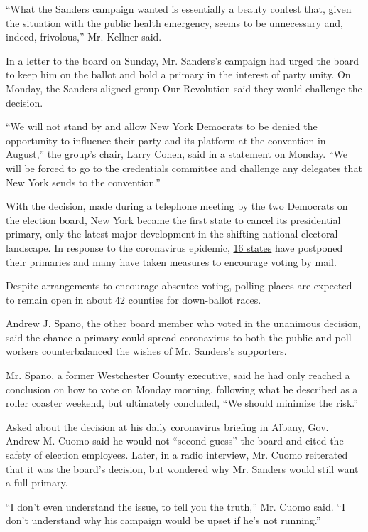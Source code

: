 ``What the Sanders campaign wanted is essentially a beauty contest that,
given the situation with the public health emergency, seems to be
unnecessary and, indeed, frivolous,'' Mr. Kellner said.

In a letter to the board on Sunday, Mr. Sanders's campaign had urged the
board to keep him on the ballot and hold a primary in the interest of
party unity. On Monday, the Sanders-aligned group Our Revolution said
they would challenge the decision.

``We will not stand by and allow New York Democrats to be denied the
opportunity to influence their party and its platform at the convention
in August,'' the group's chair, Larry Cohen, said in a statement on
Monday. ``We will be forced to go to the credentials committee and
challenge any delegates that New York sends to the convention.''

With the decision, made during a telephone meeting by the two Democrats
on the election board, New York became the first state to cancel its
presidential primary, only the latest major development in the shifting
national electoral landscape. In response to the coronavirus epidemic,
\href{https://www.nytimes3xbfgragh.onion/article/2020-campaign-primary-calendar-coronavirus.html}{16
states} have postponed their primaries and many have taken measures to
encourage voting by mail.

Despite arrangements to encourage absentee voting, polling places are
expected to remain open in about 42 counties for down-ballot races.

Andrew J. Spano, the other board member who voted in the unanimous
decision, said the chance a primary could spread coronavirus to both the
public and poll workers counterbalanced the wishes of Mr. Sanders's
supporters.

Mr. Spano, a former Westchester County executive, said he had only
reached a conclusion on how to vote on Monday morning, following what he
described as a roller coaster weekend, but ultimately concluded, ``We
should minimize the risk.''

Asked about the decision at his daily coronavirus briefing in Albany,
Gov. Andrew M. Cuomo said he would not ``second guess'' the board and
cited the safety of election employees. Later, in a radio interview, Mr.
Cuomo reiterated that it was the board's decision, but wondered why Mr.
Sanders would still want a full primary.

``I don't even understand the issue, to tell you the truth,'' Mr. Cuomo
said. ``I don't understand why his campaign would be upset if he's not
running.''

